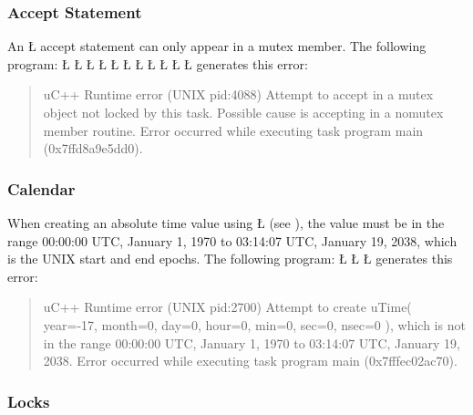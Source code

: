\documentclass[openright,twoside]{report}
\begin{document}
\subsubsection{Accept Statement}

An \LGinlinetrue\LGbegin\lgrinde\L{}\endlgrinde\LGend{} accept statement can only appear in a mutex member.
The following program:
\LGinlinefalse\LGbegin\lgrinde
\L{}
\L{}
\L{\LB{}}
\L{\LB{}}
\L{\LB{}}
\CE{}\L{\LB{}}
\L{\LB{\};}}
\L{}
\L{\LB{}}
\L{\LB{}}
\L{\LB{\}}}
\endlgrinde\LGend
generates this error:
\begin{quote}
\BGfont
uC++ Runtime error (UNIX pid:4088) Attempt to accept in a mutex object not locked by this task.
Possible cause is accepting in a nomutex member routine.
Error occurred while executing task program main (0x7ffd8a9e5dd0).
\end{quote}


\subsubsection{Calendar}

When creating an absolute time value using \LGinlinetrue\LGbegin\lgrinde\L{}\endlgrinde\LGend{} (see ), the value must be in the range 00:00:00 UTC, January 1, 1970 to 03:14:07 UTC, January 19, 2038, which is the UNIX start and end epochs.
The following program:
\LGinlinefalse\LGbegin\lgrinde
\L{}
\L{\LB{}}
\L{\LB{\}}}
\endlgrinde\LGend
generates this error:
\begin{quote}
\BGfont
uC++ Runtime error (UNIX pid:2700) Attempt to create uTime( year=-17, month=0, day=0, hour=0, min=0, sec=0, nsec=0 ), which is not in the range 00:00:00 UTC, January 1, 1970 to 03:14:07 UTC, January 19, 2038.
Error occurred while executing task program main (0x7fffec02ac70).
\end{quote}


\subsubsection{Locks}
\end{document}
